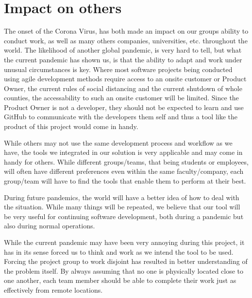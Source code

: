 \section{Impact on others}\label{sec:impactOnOthers}

The onset of the Corona Virus, has both made an impact on our groups ability to conduct work, as well as many others companies, universities, etc. throughout the world.
The likelihood of another global pandemic, is very hard to tell, but what the current pandemic has shown us, is that the ability to adapt and work under unusual circumstances is key.
Where most software projects being conducted using agile development methods require access to an onsite customer or Product Owner, the current rules of social distancing and the current shutdown of whole counties, the accessability to such an onsite customer will be limited.
Since the Product Owner is not a developer, they should not be expected to learn and use GitHub to communicate with the developers them self and thus a tool like the product of this project would come in handy.

While others may not use the same development process and workflow as we have, the tools we integrated in our solution is very applicable and may come in handy for others.
While different groups/teams, that being students or employees, will often have different preferences even within the same faculty/company, each group/team will have to find the tools that enable them to perform at their best.

During future pandemics, the world will have a better idea of how to deal with the situation.
While many things will be repeated, we believe that our tool will be very useful for continuing software development, both during a pandemic but also during normal operations.

While the current pandemic may have been very annoying during this project, it has in its sense forced us to think and work as we intend the tool to be used.
Forcing the project group to work disjoint has resulted in better understanding of the problem itself.
By always assuming that no one is physically located close to one another, each team member should be able to complete their work just as effectively from remote locations.
